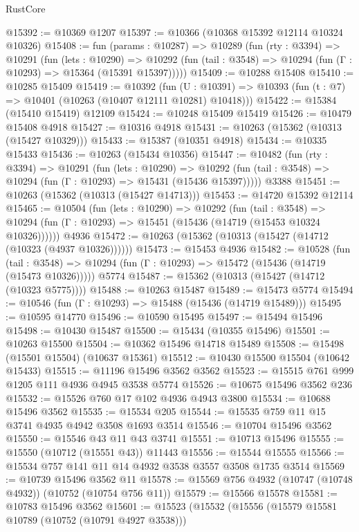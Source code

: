 \begin{lexlean}{RustCore}
\begin{coremodule}
@15392 := @10369 @1207
@15397 := @10366 (@10368 @15392 @12114 @10324 @10326)
@15408 := fun (params : @10287) =>
  @10289
    (fun (rty : @3394) =>
    @10291
      (fun (lets : @10290) =>
      @10292 (fun (tail : @3548) => @10294 (fun (Γ : @10293) => @15364 (@15391 @15397)))))
@15409 := @10288 @15408
@15410 := @10285 @15409
@15419 := @10392
    (fun (U : @10391) => @10393 (fun (t : @7) => @10401 (@10263 (@10407 @12111 @10281) @10418)))
@15422 := @15384 (@15410 @15419) @12109
@15424 := @10248 @15409 @15419
@15426 := @10479 @15408 @4918
@15427 := @10316 @4918
@15431 := @10263 (@15362 (@10313 (@15427 @10329)))
@15433 := @15387 (@10351 @4918)
@15434 := @10335 @15433
@15436 := @10263 (@15434 @10356)
@15447 := @10482
    (fun (rty : @3394) =>
    @10291
      (fun (lets : @10290) =>
      @10292 (fun (tail : @3548) => @10294 (fun (Γ : @10293) => @15431 (@15436 @15397)))))
    @3388
@15451 := @10263 (@15362 (@10313 (@15427 @14713)))
@15453 := @14720 @15392 @12114
@15465 := @10504
    (fun (lets : @10290) =>
    @10292
      (fun (tail : @3548) =>
      @10294 (fun (Γ : @10293) => @15451 (@15436 (@14719 (@15453 @10324 @10326))))))
    @4936
@15472 := @10263 (@15362 (@10313 (@15427 (@14712 (@10323 (@4937 @10326))))))
@15473 := @15453 @4936
@15482 := @10528
    (fun (tail : @3548) => @10294 (fun (Γ : @10293) => @15472 (@15436 (@14719 (@15473 @10326)))))
    @5774
@15487 := @15362 (@10313 (@15427 (@14712 (@10323 @5775))))
@15488 := @10263 @15487
@15489 := @15473 @5774
@15494 := @10546 (fun (Γ : @10293) => @15488 (@15436 (@14719 @15489)))
@15495 := @10595 @14770
@15496 := @10590 @15495
@15497 := @15494 @15496
@15498 := @10430 @15487
@15500 := @15434 (@10355 @15496)
@15501 := @10263 @15500
@15504 := @10362 @15496 @14718 @15489
@15508 := @15498 (@15501 @15504) (@10637 @15361)
@15512 := @10430 @15500 @15504 (@10642 @15433)
@15515 := @11196 @15496 @3562 @3562
@15523 := @15515 @761 @999 @1205 @111 @4936 @4945 @3538 @5774
@15526 := @10675 @15496 @3562 @236
@15532 := @15526 @760 @17 @102 @4936 @4943 @3800
@15534 := @10688 @15496 @3562
@15535 := @15534 @205
@15544 := @15535 @759 @11 @15 @3741 @4935 @4942 @3508 @1693 @3514
@15546 := @10704 @15496 @3562
@15550 := @15546 @43 @11 @43 @3741
@15551 := @10713 @15496
@15555 := @15550 (@10712 (@15551 @43)) @11443
@15556 := @15544 @15555
@15566 := @15534 @757 @141 @11 @14 @4932 @3538 @3557 @3508 @1735 @3514
@15569 := @10739 @15496 @3562 @11
@15578 := @15569 @756 @4932 (@10747 (@10748 @4932)) (@10752 (@10754 @756 @11))
@15579 := @15566 @15578
@15581 := @10783 @15496 @3562
@15601 := @15523
    (@15532
      (@15556
        (@15579 @15581 @10789 (@10752 (@10791 @4927 @3538)))

\end{coremodule}
\end{lexlean}

